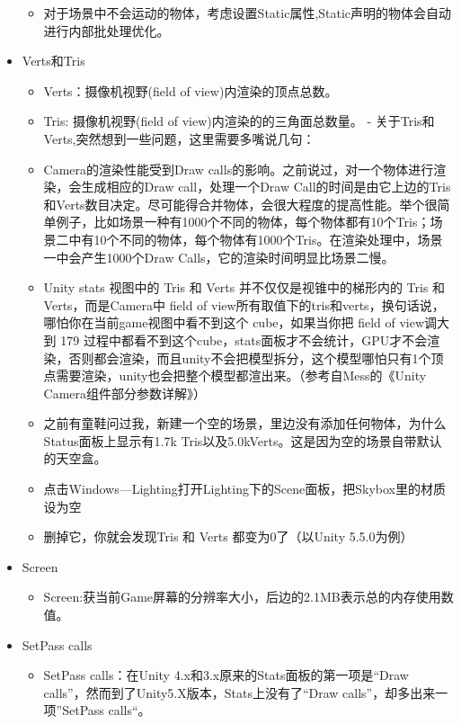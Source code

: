 \documentclass[9pt, b5paper]{article}
\begin{document}
\begin{itemize}
\begin{itemize}
\item 对于场景中不会运动的物体，考虑设置Static属性,Static声明的物体会自动进行内部批处理优化。
\end{itemize}
\item Verts和Tris  
\begin{itemize}
\item Verts：摄像机视野(field of view)内渲染的顶点总数。
\item Tris:   摄像机视野(field of view)内渲染的的三角面总数量。                                                                                                                             - 关于Tris和Verts,突然想到一些问题，这里需要多嘴说几句：
\item Camera的渲染性能受到Draw calls的影响。之前说过，对一个物体进行渲染，会生成相应的Draw call，处理一个Draw Call的时间是由它上边的Tris和Verts数目决定。尽可能得合并物体，会很大程度的提高性能。举个很简单例子，比如场景一种有1000个不同的物体，每个物体都有10个Tris；场景二中有10个不同的物体，每个物体有1000个Tris。在渲染处理中，场景一中会产生1000个Draw Calls，它的渲染时间明显比场景二慢。
\item Unity stats 视图中的 Tris 和 Verts 并不仅仅是视锥中的梯形内的 Tris 和 Verts，而是Camera中 field of view所有取值下的tris和verts，换句话说，哪怕你在当前game视图中看不到这个 cube，如果当你把 field of view调大到 179 过程中都看不到这个cube，stats面板才不会统计，GPU才不会渲染，否则都会渲染，而且unity不会把模型拆分，这个模型哪怕只有1个顶点需要渲染，unity也会把整个模型都渲出来。（参考自Mess的《Unity Camera组件部分参数详解》）
\item 之前有童鞋问过我，新建一个空的场景，里边没有添加任何物体，为什么Status面板上显示有1.7k Tris以及5.0kVerts。这是因为空的场景自带默认的天空盒。
\item 点击Windows---Lighting打开Lighting下的Scene面板，把Skybox里的材质设为空
\item 删掉它，你就会发现Tris 和 Verts 都变为0了（以Unity 5.5.0为例）
\end{itemize}
\item Screen
\begin{itemize}
\item Screen:获当前Game屏幕的分辨率大小，后边的2.1MB表示总的内存使用数值。
\end{itemize}
\item SetPass calls
\begin{itemize}
\item SetPass calls：在Unity 4.x和3.x原来的Stats面板的第一项是“Draw calls”，然而到了Unity5.X版本，Stats上没有了“Draw calls”，却多出来一项”SetPass calls“。

\end{itemize}
\end{itemize}
\end{document}
